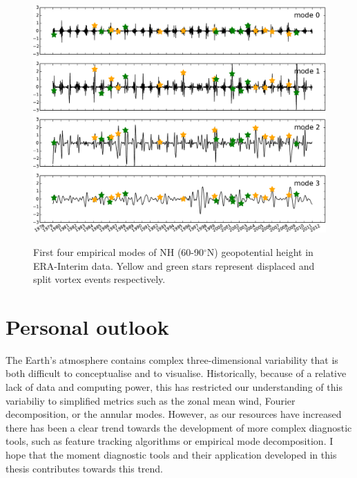 \begin{figure}[t]
  \centering
  \noindent\includegraphics[width=\textwidth,angle=0]{figures/chapter-conclusions/EMD.pdf}\\
  \caption[EMD timeseries]{First four empirical modes of NH (60-90$^{\circ}$N)
    geopotential height in ERA-Interim data. Yellow and green stars represent
    displaced and split vortex events respectively.}\label{fig:emd}
\end{figure}


\section{Personal outlook}

The Earth's atmosphere contains complex three-dimensional variability that is
both difficult to conceptualise and to visualise. Historically, because of a
relative lack of data and computing power, this has restricted our understanding
of this variabiliy to simplified metrics such as the zonal mean wind, Fourier
decomposition, or the annular modes. However, as our resources have increased
there has been a clear trend towards the development of more complex diagnostic
tools, such as feature tracking algorithms or empirical mode decomposition. I
hope that the moment diagnostic tools and their application developed in this
thesis contributes towards this trend.

